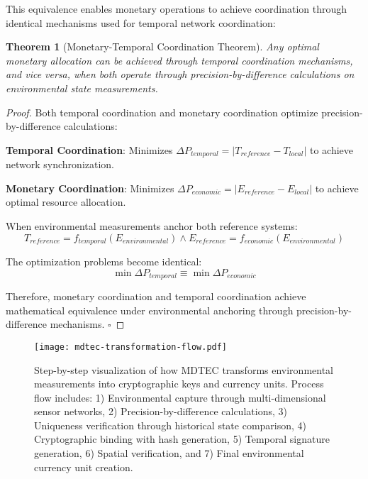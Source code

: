\documentclass[12pt,a4paper]{article}
\newtheorem{theorem}{Theorem}
\begin{document}
This equivalence enables monetary operations to achieve coordination through identical mechanisms used for temporal network coordination:

\begin{theorem}[Monetary-Temporal Coordination Theorem]
Any optimal monetary allocation can be achieved through temporal coordination mechanisms, and vice versa, when both operate through precision-by-difference calculations on environmental state measurements.
\end{theorem}

\begin{proof}
Both temporal coordination and monetary coordination optimize precision-by-difference calculations:

\textbf{Temporal Coordination}: Minimizes $\Delta P_{temporal} = |T_{reference} - T_{local}|$ to achieve network synchronization.

\textbf{Monetary Coordination}: Minimizes $\Delta P_{economic} = |E_{reference} - E_{local}|$ to achieve optimal resource allocation.

When environmental measurements anchor both reference systems:
\begin{equation}
T_{reference} = f_{temporal}(E_{environmental}) \land E_{reference} = f_{economic}(E_{environmental})
\end{equation}

The optimization problems become identical:
\begin{equation}
\min \Delta P_{temporal} \equiv \min \Delta P_{economic}
\end{equation}

Therefore, monetary coordination and temporal coordination achieve mathematical equivalence under environmental anchoring through precision-by-difference mechanisms. $\square$
\end{proof}

\begin{figure}[H]
\centering
\texttt{[image: mdtec-transformation-flow.pdf]}
\caption{Step-by-step visualization of how MDTEC transforms environmental measurements into cryptographic keys and currency units. Process flow includes: 1) Environmental capture through multi-dimensional sensor networks, 2) Precision-by-difference calculations, 3) Uniqueness verification through historical state comparison, 4) Cryptographic binding with hash generation, 5) Temporal signature generation, 6) Spatial verification, and 7) Final environmental currency unit creation.}
\label{fig:mdtec_transformation}
\end{figure}
\end{document}
